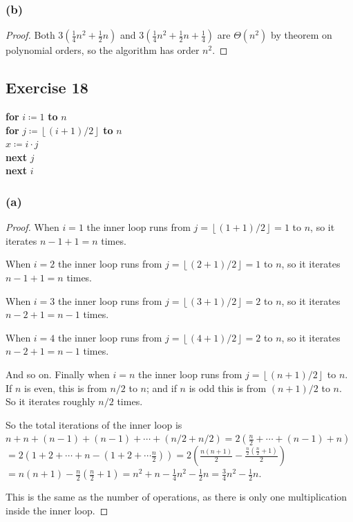 \documentclass[14pt]{extarticle}
\newcommand{\dps}{\displaystyle}
\newcommand{\floor}[1]{{\left\lfloor#1\right\rfloor}}
\begin{document}
\subsubsection{(b)}
\begin{proof}
    Both \(\dps 3 \left(\frac{1}{4}n^2+\frac{1}{2}n\right)\) and \(\dps 3 \left(\frac{1}{4}n^2+\frac{1}{2}n+\frac{1}{4}\right)\)
    are \(\Theta(n^2)\) by theorem on polynomial orders, so the algorithm has order \(n^2\).
\end{proof}

\subsection{Exercise 18}
\begin{tabbing}
    {\bf for} \= \(i \coloneqq 1\) {\bf to} \(n\) \\
    \> {\bf for} \= \(j \coloneqq \floor{(i+1)/2}\) {\bf to} \(n\) \\
    \>           \> \(x \coloneqq i \cdot j\) \\
    \> {\bf next} \(j\) \\
    {\bf next} \(i\)
\end{tabbing}

\subsubsection{(a)}
\begin{proof}
    When \(i=1\) the inner loop runs from \(j = \floor{(1+1)/2} = 1\) to \(n\), so it iterates \(n-1+1 = n\) times.

    When \(i=2\) the inner loop runs from \(j = \floor{(2+1)/2} = 1\) to \(n\), so it iterates \(n-1+1 = n\) times.

    When \(i=3\) the inner loop runs from \(j = \floor{(3+1)/2} = 2\) to \(n\), so it iterates \(n-2+1 = n-1\) times.

    When \(i=4\) the inner loop runs from \(j = \floor{(4+1)/2} = 2\) to \(n\), so it iterates \(n-2+1 = n-1\) times.

    And so on. Finally when \(i = n\) the inner loop runs from \(j = \floor{(n+1)/2}\) to \(n\). If \(n\) is even, this is from
    \(n/2\) to \(n\); and if \(n\) is odd this is from \((n+1)/2\) to \(n\). So it iterates roughly \(n/2\) times.

    So the total iterations of the inner loop is \(n+n+(n-1)+(n-1)+ \cdots + (n/2 + n/2) = 2(\frac{n}{2} + \cdots + (n-1) + n)\)
    \(= 2(1+2+ \cdots + n - (1+2+ \cdots \frac{n}{2})) = 2 \left( \frac{n(n+1)}{2}-\frac{\frac{n}{2}(\frac{n}{2}+1)}{2}\right)\)
    \(= n(n+1) - \frac{n}{2}(\frac{n}{2}+1) = n^2 + n - \frac{1}{4}n^2 - \frac{1}{2}n = \frac{3}{4}n^2 - \frac{1}{2}n\).

    This is the same as the number of operations, as there is only one multiplication inside the inner loop.
\end{proof}
\end{document}
